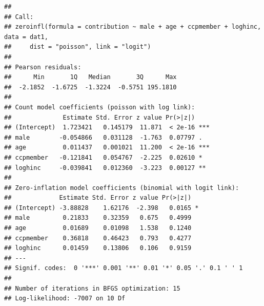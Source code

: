 \documentclass[
]{ctexart}
\begin{document}
\begin{verbatim}
## 
## Call:
## zeroinfl(formula = contribution ~ male + age + ccpmember + loghinc, data = dat1, 
##     dist = "poisson", link = "logit")
## 
## Pearson residuals:
##      Min       1Q   Median       3Q      Max 
##  -2.1852  -1.6725  -1.3224  -0.5751 195.1810 
## 
## Count model coefficients (poisson with log link):
##              Estimate Std. Error z value Pr(>|z|)    
## (Intercept)  1.723421   0.145179  11.871  < 2e-16 ***
## male        -0.054866   0.031128  -1.763  0.07797 .  
## age          0.011437   0.001021  11.200  < 2e-16 ***
## ccpmember   -0.121841   0.054767  -2.225  0.02610 *  
## loghinc     -0.039841   0.012360  -3.223  0.00127 ** 
## 
## Zero-inflation model coefficients (binomial with logit link):
##             Estimate Std. Error z value Pr(>|z|)  
## (Intercept) -3.88828    1.62176  -2.398   0.0165 *
## male         0.21833    0.32359   0.675   0.4999  
## age          0.01689    0.01098   1.538   0.1240  
## ccpmember    0.36818    0.46423   0.793   0.4277  
## loghinc      0.01459    0.13806   0.106   0.9159  
## ---
## Signif. codes:  0 '***' 0.001 '**' 0.01 '*' 0.05 '.' 0.1 ' ' 1 
## 
## Number of iterations in BFGS optimization: 15 
## Log-likelihood: -7007 on 10 Df
\end{verbatim}
\end{document}
